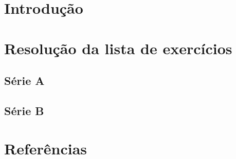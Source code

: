 \documentclass[
  12pt,     %
  openright,      %
  oneside,      %
  a4paper     %
  ]{abntex2}
\begin{document}

\frenchspacing


\imprimircapa

\imprimirfolhaderosto

\tableofcontents*
\cleardoublepage

\textual

\chapter{Introdução}

\chapter{Resolução da lista de exercícios}

\section{Série A}

\section{Série B}

\chapter{Referências}

\end{document}

